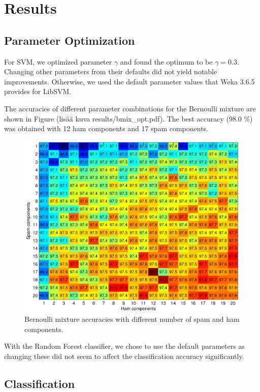 \section{Results} \label{sec:results}

\subsection{Parameter Optimization}

For SVM, we optimized parameter $\gamma$ and found the optimum to be
$\gamma = 0.3$. Changing other parameters from their defaults did not
yield notable improvements. Otherwise, we used the default parameter
values that Weka 3.6.5 provides for LibSVM.

The accuracies of different parameter combinations for the Bernoulli
mixture are shown in Figure (lisää kuva results/bmix\_opt.pdf). The best
accuracy (98.0 \%) was obtained with 12 ham components and 17 spam
components.

\begin{figure}[!ht]
\centering
\includegraphics[width=\linewidth]{../results/bmix_opt.pdf}
\caption{Bernoulli mixture accuracies with different number of spam and ham components.}
\label{fig:bmix}
\end{figure}

With the Random Forest classifier, we chose to use the default
parameters as changing these did not seem to affect the classification
accuracy significantly.

\subsection{Classification}

